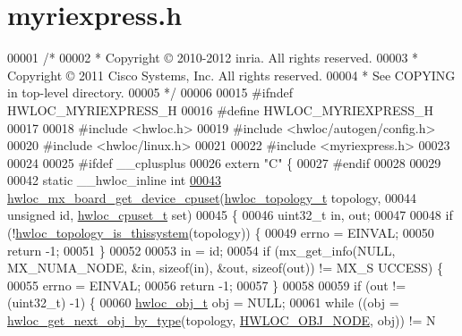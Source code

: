 \hypertarget{a00036_source}{
\section{myriexpress.h}
}

\begin{DoxyCode}
00001 \textcolor{comment}{/*}
00002 \textcolor{comment}{ * Copyright © 2010-2012 inria.  All rights reserved.}
00003 \textcolor{comment}{ * Copyright © 2011 Cisco Systems, Inc.  All rights reserved.}
00004 \textcolor{comment}{ * See COPYING in top-level directory.}
00005 \textcolor{comment}{ */}
00006 
00015 \textcolor{preprocessor}{#ifndef HWLOC\_MYRIEXPRESS\_H}
00016 \textcolor{preprocessor}{}\textcolor{preprocessor}{#define HWLOC\_MYRIEXPRESS\_H}
00017 \textcolor{preprocessor}{}
00018 \textcolor{preprocessor}{#include <hwloc.h>}
00019 \textcolor{preprocessor}{#include <hwloc/autogen/config.h>}
00020 \textcolor{preprocessor}{#include <hwloc/linux.h>}
00021 
00022 \textcolor{preprocessor}{#include <myriexpress.h>}
00023 
00024 
00025 \textcolor{preprocessor}{#ifdef \_\_cplusplus}
00026 \textcolor{preprocessor}{}\textcolor{keyword}{extern} \textcolor{stringliteral}{"C"} \{
00027 \textcolor{preprocessor}{#endif}
00028 \textcolor{preprocessor}{}
00029 
00042 \textcolor{keyword}{static} \_\_hwloc\_inline \textcolor{keywordtype}{int}
\hypertarget{a00036_source_l00043}{}\hyperlink{a00073_ga87f4746d0cad579ce4e86b98088f22a1}{00043} \hyperlink{a00073_ga87f4746d0cad579ce4e86b98088f22a1}{hwloc_mx_board_get_device_cpuset}(\hyperlink{a00039_ga9d1e76ee15a7dee158b786c30b6a6e38}{hwloc_topology_t} topology,
00044                                  \textcolor{keywordtype}{unsigned} \textcolor{keywordtype}{id}, \hyperlink{a00040_ga4bbf39b68b6f568fb92739e7c0ea7801}{hwloc_cpuset_t} \textcolor{keyword}{set})
00045 \{
00046   uint32\_t in, out;
00047 
00048   \textcolor{keywordflow}{if} (!\hyperlink{a00046_ga0d109e33fc7990f62f665d336e5e5111}{hwloc_topology_is_thissystem}(topology)) \{
00049     errno = EINVAL;
00050     \textcolor{keywordflow}{return} -1;
00051   \}
00052 
00053   in = id;
00054   \textcolor{keywordflow}{if} (mx\_get\_info(NULL, MX\_NUMA\_NODE, &in, \textcolor{keyword}{sizeof}(in), &out, \textcolor{keyword}{sizeof}(out)) != MX\_S
      UCCESS) \{
00055     errno = EINVAL;
00056     \textcolor{keywordflow}{return} -1;
00057   \}
00058 
00059   \textcolor{keywordflow}{if} (out != (uint32\_t) -1) \{
00060     \hyperlink{a00016}{hwloc_obj_t} obj = NULL;
00061     \textcolor{keywordflow}{while} ((obj = \hyperlink{a00053_ga5f08ceb69375341e73563cfe2e77534e}{hwloc_get_next_obj_by_type}(topology, \hyperlink{a00041_ggacd37bb612667dc437d66bfb175a8dc55aaf0964881117bdedf1a5e9332cd120dd}{HWLOC_OBJ_NODE}, obj)) != N

\end{DoxyCode}

